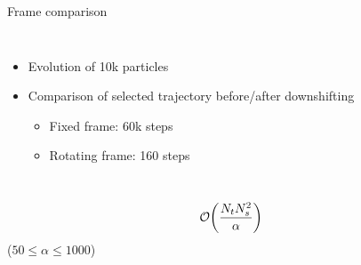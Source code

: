 \documentclass[aspectratio=169, usenames, dvipsnames]{beamer}
\begin{document}
\begin{frame}{Frame comparison}
  \begin{columns}
      \begin{itemize}
        \item Evolution of 10k particles
        \item Comparison of selected trajectory before/after downshifting
          \begin{itemize}
            \item Fixed frame: 60k steps
            \item Rotating frame: 160 steps
          \end{itemize}
      \end{itemize}

      \begin{center}
        
      \end{center}
  \end{columns}
\end{frame}

\begin{frame}[standout]
  \begingroup
    \Huge
    \begin{equation*}
      \mathcal{O}\qty(\frac{N_t N_s^2}{\alpha})
    \end{equation*}
  \endgroup
  \vfill
  \hfill ($50 \leqslant \alpha \leqslant 1000$)
\end{frame}
\end{document}
